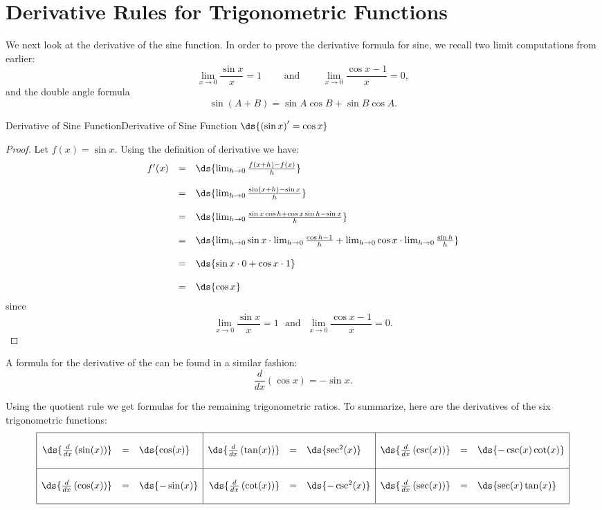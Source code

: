 \section{Derivative Rules for Trigonometric Functions}\label{sec:DerivativeRulesTrig}
We next look at the derivative of the sine function.
In order to prove the derivative formula for sine, we recall two limit computations from earlier:
$$\lim_{x\to 0}\frac{\sin x}{x}=1\qquad\mbox{~and~}\qquad\lim_{x\to 0}\frac{\cos x -1}{x}=0,$$
and the double angle formula
$$\sin\left(A+B\right)=\sin A\cos B+\sin B\cos A.$$

\begin{theorem}{Derivative of Sine Function}{Derivative of Sine Function}
$\ds{\left(\sin x\right)'=\cos x}$
\end{theorem}

\begin{proof}
Let $f(x)=\sin x$. 
Using the definition of derivative we have:
$$\begin{array}{ccl}
f'(x) & = &  \ds{\lim_{h\to 0}\frac{f(x+h)-f(x)}{h}}\\
\\
& = & \ds{\lim_{h\to 0}\frac{\sin(x+h)-\sin x}{h}}\\
\\
& = & \ds{\lim_{h\to 0}\frac{\sin x\cos h+\cos x\sin h-\sin x}{h}}\\
\\
& = & \ds{\lim_{h\to 0}\sin x\cdot\lim_{h\to 0}\frac{\cos h-1}{h}+\lim_{h\to 0}\cos x\cdot\lim_{h\to 0}\frac{\sin h}{h}}\\
\\
& = & \ds{\sin x\cdot 0+\cos x\cdot 1}\\
\\
& = & \ds{\cos x}\\
\end{array}$$
since 
$$\lim_{x\to 0}\frac{\sin x}{x}=1\mbox{~~and~~}\lim_{x\to 0}\frac{\cos x -1}{x}=0.$$
\end{proof}

A formula for the derivative of the  can be found in a similar fashion:
$$\frac{d}{dx}(\cos x)=-\sin x.$$

Using the quotient rule we get formulas for the remaining trigonometric ratios. To summarize, here are the derivatives of the six trigonometric functions:
$$\begin{array}{|rcl|rcl|rcl|}
\hline
~&~&~&~&~&~&~&~&~\\
\ds{\frac{d}{dx}\left(\sin(x)\right)} &= & \ds{\cos(x)} &
\ds{\frac{d}{dx}\left(\tan(x)\right)}&= & \ds{\sec^2(x)} &
\ds{\frac{d}{dx}\left(\csc(x)\right)} &= & \ds{-\csc(x)\cot(x)} \\
~&~&~&~&~&~&~&~&~\\
\hline
~&~&~&~&~&~&~&~&~\\
\ds{\frac{d}{dx}\left(\cos(x)\right)} &= & \ds{-\sin(x)} &
\ds{\frac{d}{dx}\left(\cot(x)\right)} &= & \ds{-\csc^2(x)} &
\ds{\frac{d}{dx}\left(\sec(x)\right)} &= & \ds{\sec(x)\tan(x)} \\
~&~&~&~&~&~&~&~&~\\
\hline
\end{array}$$


